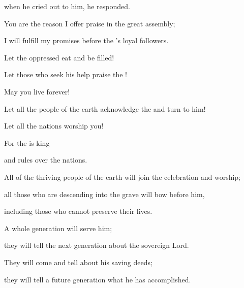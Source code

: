 {\par }{\Q when he cried out
to
him, he responded.
\par }{\Q {}You are the reason I offer praise
in the great
assembly;
\par }{\Q I will fulfill my promises
before
the
{}’s loyal followers.
\par }{\Q {}Let the oppressed
eat
and be filled!

\par }{\Q Let those who seek
his help praise
the {}!
\par }{\Q May you live
forever!
\par }{\Q {}Let
all
the people of the earth
acknowledge
the {}
and turn
to
him!

\par }{\Q Let all
the nations
worship you!
\par }{\Q {}For
the {}
is king
\par }{\Q and rules
over the nations.
\par }{\Q {}All
of the thriving
people of the earth
will join the celebration
and worship;
\par }{\Q all
those who are descending
into the grave
will bow
before
him,
\par }{\Q including those who cannot
preserve
their lives.
\par }{\Q {}A whole generation
will serve
him;
\par }{\Q they will tell
the next generation
about the sovereign Lord.
\par }{\Q {}They will come
and tell
about his saving deeds;
\par }{\Q they will tell a future
generation
what
he has accomplished.


\par }
